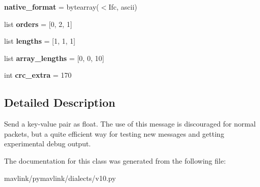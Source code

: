 \begin{DoxyCompactItemize}
{\bfseries native\+\_\+format} = bytearray(\textquotesingle{}$<$Ifc\textquotesingle{}, \textquotesingle{}ascii\textquotesingle{})
\item 
\mbox{\label{classpymavlink_1_1dialects_1_1v10_1_1MAVLink__named__value__float__message_a1ed0f4ffa0d7e51c5c1876070b5aff2f}} 
list {\bfseries orders} = \mbox{[}0, 2, 1\mbox{]}
\item 
\mbox{\label{classpymavlink_1_1dialects_1_1v10_1_1MAVLink__named__value__float__message_a818f926dc3db85cc7826c05fcbbc85f0}} 
list {\bfseries lengths} = \mbox{[}1, 1, 1\mbox{]}
\item 
\mbox{\label{classpymavlink_1_1dialects_1_1v10_1_1MAVLink__named__value__float__message_a8d194090e2a72403946431be4de0d70b}} 
list {\bfseries array\+\_\+lengths} = \mbox{[}0, 0, 10\mbox{]}
\item 
\mbox{\label{classpymavlink_1_1dialects_1_1v10_1_1MAVLink__named__value__float__message_af12347e9b1a109d4340deaeb4a00192d}} 
int {\bfseries crc\+\_\+extra} = 170
\end{DoxyCompactItemize}


\subsection{Detailed Description}
\begin{DoxyVerb}Send a key-value pair as float. The use of this message is
discouraged for normal packets, but a quite efficient way for
testing new messages and getting experimental debug output.
\end{DoxyVerb}
 

The documentation for this class was generated from the following file\+:\begin{DoxyCompactItemize}
\item 
mavlink/pymavlink/dialects/v10.\+py\end{DoxyCompactItemize}
